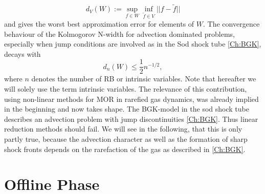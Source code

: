\begin{equation}
	d_{V}(W):= \sup_{f \in W} \inf_{\tilde{f} \in V} ||f-\tilde{f}||
\end{equation}
and gives the worst best approximation error for elements of \(W\). The convergence behaviour of the Kolmogorov N-width for advection dominated problems, especially when jump conditions are involved as in the Sod shock tube \cref{Ch:BGK}, decays with
\begin{equation}
	d_n(W) \leq \frac{1}{2} n^{-1/2},
	\label{Eq:KolmoAdv}
\end{equation}
where \(n\) denotes the number of RB or intrinsic variables. Note that hereafter we will solely use the term intrinsic variables\cite{ohlberger2015reduced}. The relevance of this contribution, using non-linear methods for MOR in rarefied gas dynamics, was already implied in the beginning and now takes shape. The BGK-model in the sod shock tube describes an advection problem with jump discontinuities \cref{Ch:BGK}. Thus linear reduction methods should fail. We will see in the following, that this is only partly true, because the advection character as well as the formation of sharp shock fronts depends on the rarefaction of the gas as described in \cref{Ch:BGK}.
\section{Offline Phase}

